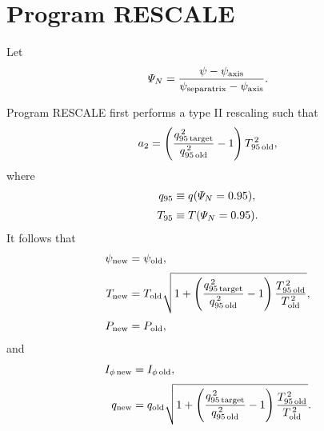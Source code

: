 \documentclass[12pt]{article}
\begin{document}
\section{Program {\sc RESCALE}}
Let
\begin{equation}
{\mit\Psi}_N = \frac{\psi - \psi_{\rm axis}}{\psi_{\rm separatrix}-\psi_{\rm axis}}.
\end{equation}

Program {\sc RESCALE} first performs a type II rescaling such that 
\begin{equation}
a_2 = \left(\frac{q_{95\,{\rm target}}^{\,2}}{q_{95\,{\rm old}}^{\,2}}-1\right)T_{95\,{\rm old}}^{\,2},
\end{equation}
where
\begin{align}
q_{95} &\equiv q({\mit\Psi}_N=0.95),\\[0.5ex]
T_{95}&\equiv T({\mit\Psi}_N=0.95).
\end{align}
It follows that
\begin{align}
\psi_{\rm new} &= \psi_{\rm old},\\[0.5ex]
T_{\rm new} & =T_{\rm old}\sqrt{1 +\left(\frac{q_{95\,{\rm target}}^{\,2}}{q_{95\,{\rm old}}^{\,2}}-1\right)\frac{T_{95\,{\rm old}}^{\,2}}{T_{\rm old}^{\,2}}},\\[0.5ex]
P_{\rm new} &= P_{\rm old},
\end{align}
and
\begin{align}
I_{\phi\,{\rm new}} &=I_{\phi\,{\rm old}},\\[0.5ex]
q_{\rm new} &= q_{\rm old}\sqrt{1 +\left(\frac{q_{95\,{\rm target}}^{\,2}}{q_{95\,{\rm old}}^{\,2}}-1\right)\frac{T_{95\,{\rm old}}^{\,2}}{T_{\rm old}^{\,2}}}.
\end{align} 
\end{document}
